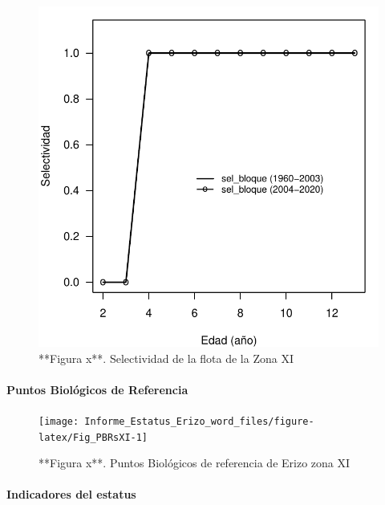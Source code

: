 \documentclass[
]{article}
\begin{document}
\begin{figure}

{\centering \includegraphics{Figuras/Fig_SelFlotaXI-1} 

}

\caption{**Figura x**. Selectividad de la flota de la Zona XI}\label{fig:Fig_SelFlotaXI}
\end{figure}

\hypertarget{puntos-bioluxf3gicos-de-referencia-2}{%
\paragraph{Puntos Biológicos de
Referencia}\label{puntos-bioluxf3gicos-de-referencia-2}}

\begin{figure}

{\centering \texttt{[image: Informe\_Estatus\_Erizo\_word\_files/figure-latex/Fig\_PBRsXI-1]} 

}

\caption{**Figura x**. Puntos Biológicos de referencia de Erizo zona XI}\label{fig:Fig_PBRsXI}
\end{figure}

\hypertarget{indicadores-del-estatus-1}{%
\paragraph{Indicadores del estatus}\label{indicadores-del-estatus-1}}
\end{document}
